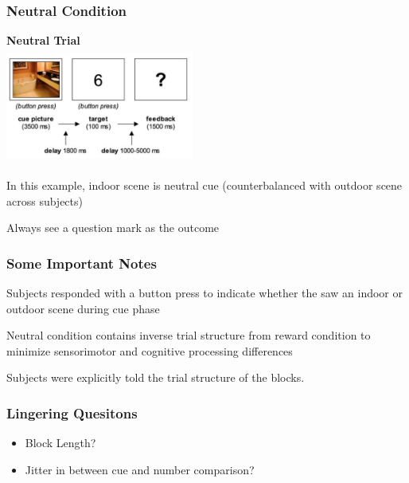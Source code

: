 \documentclass{beamer}
\begin{document}
\begin{frame}
\frametitle{Neutral Condition}
\begin{center}
\bf{Neutral Trial} \\
	\includegraphics[height=38mm,width=62mm]{neutralcond} \\
	\begin{itemize}
		\footnotesize{
		\item In this example, indoor scene is neutral cue (counterbalanced with outdoor scene across subjects)
		\item Always see a question mark as the outcome }
	\end{itemize}
\end{center}
\end{frame}

\begin{frame}
\frametitle{Some Important Notes}
\begin{itemize}
    {\small 
	\item Subjects responded with a button press to indicate whether the saw an indoor or outdoor scene during cue phase
	\item Neutral condition contains inverse trial structure from reward condition to minimize sensorimotor and cognitive processing differences
	\item Subjects were explicitly told the trial structure of the blocks.
	}
\end{itemize}
\end{frame}

\begin{frame}
\frametitle{Lingering Quesitons}
	\begin{itemize}
		\item Block Length?
		\item Jitter in between cue and number comparison?
	\end{itemize}
\end{frame}
\end{document}
